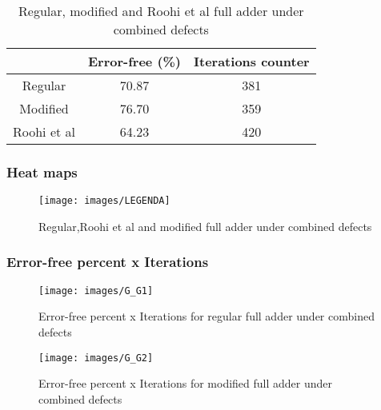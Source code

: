 \begin{table}[h]
\begin{center}
\begin{tabular}{|c|c|c|}
\hline
 & Error-free (\%) & Iterations counter \\
\hline
 Regular & 70.87 & 381 \\
\hline
 Modified & 76.70 & 359 \\
\hline
 Roohi et al & 64.23 & 420 \\
\hline

\end{tabular}
\caption{Regular, modified and Roohi et al full adder under combined defects}
\end{center}
\end{table}

\pagebreak
\subsubsection{Heat maps}

\flushleft

\begin{figure}[h!]
\center
{}
\hfill
{}
\hfill
{}
\linebreak
{\texttt{[image: images/LEGENDA]}
}
\caption{Regular,Roohi et al and modified full adder under combined defects}
\label{figure:full_t1}
\end{figure}

\pagebreak
\subsubsection{Error-free percent x Iterations}

\begin{figure}[h]
\center
\texttt{[image: images/G\_G1]}
\caption{Error-free percent x Iterations for regular full adder under combined defects}
\label{figure:full_reg_gt1}
\end{figure}

\begin{figure}[h!]
\center
\texttt{[image: images/G\_G2]}
\caption{Error-free percent x Iterations for modified full adder under combined defects}
\label{figure:full_mod1_gt1}
\end{figure}

